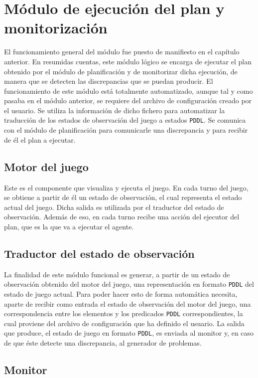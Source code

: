 \section{Módulo de ejecución del plan y monitorización}

El funcionamiento general del módulo fue puesto de manifiesto en el capítulo anterior. En resumidas
cuentas, este módulo lógico se encarga de ejecutar el plan obtenido por el módulo de planificación
y de monitorizar dicha ejecución, de manera que se detecten las discrepancias que se puedan producir.
El funcionamiento de este módulo está totalmente automatizado, aunque tal y como pasaba en el módulo
anterior, se requiere del archivo de configuración creado por el usuario. Se utiliza la información
de dicho fichero para automatizar la traducción de los estados de observación del juego a estados
\texttt{PDDL}. Se comunica con el módulo de planificación para comunicarle una discrepancia
y para recibir de él el plan a ejecutar.

\subsection{Motor del juego}

Este es el componente que visualiza y ejecuta el juego. En cada turno del juego, se obtiene a partir de él un
estado de observación, el cual representa el estado actual del juego. Dicha salida es utilizada por el
traductor del estado de observación. Además de eso, en cada turno recibe una acción del ejecutor del plan,
que es la que va a ejecutar el agente.

\subsection{Traductor del estado de observación}

La finalidad de este módulo funcional es generar, a partir de un estado de observación obtenido del
motor del juego, una representación en formato \texttt{PDDL} del estado de juego actual. Para poder
hacer esto de forma automática necesita, aparte de recibir como entrada el estado de observación del
motor del juego, una correspondencia entre los elementos y los predicados \texttt{PDDL} correspondientes,
la cual proviene del archivo de configuración que ha definido el usuario. La salida que produce,
el estado de juego en formato \texttt{PDDL}, es enviada al monitor y, en caso de que éste detecte
una discrepancia, al generador de problemas.

\subsection{Monitor}

